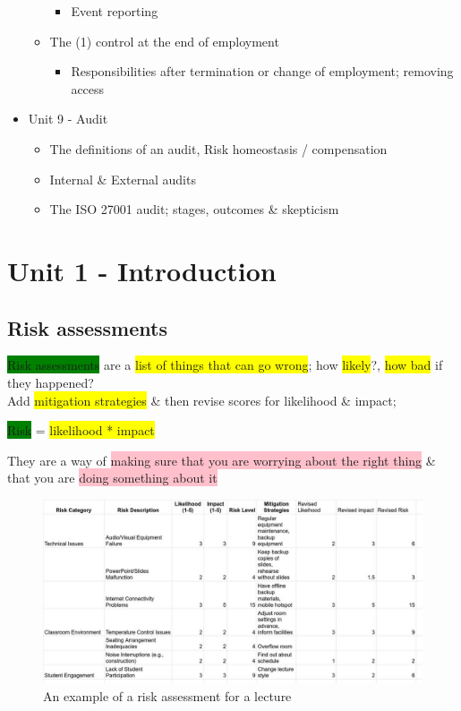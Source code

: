 \documentclass[tikz,border=10pt]{project_plan}
\begin{document}
\begin{itemize}
\begin{itemize}
\begin{itemize}
                  \item Event reporting
                \end{itemize}
          \item The (1) control at the end of employment
                \begin{itemize}
                  \item Responsibilities after termination or change of employment; removing access
                \end{itemize}
        \end{itemize}
  \item Unit 9 - Audit
        \begin{itemize}
          \item The definitions of an audit, Risk homeostasis / compensation
          \item Internal \& External audits
          \item The ISO 27001 audit; stages, outcomes \& skepticism
        \end{itemize}
\end{itemize}

\newpage

\tableofcontents{}\newpage

\chapter{Unit 1 - Introduction}

\section{Risk assessments}
\colorbox{green}{Risk assessments} are a \colorbox{yellow}{list of things that can go wrong}; how \colorbox{yellow}{likely}?, \colorbox{yellow}{how bad} if they happened?\\
Add \colorbox{yellow}{mitigation strategies} \& then revise scores for likelihood \& impact;

\colorbox{green}{Risk} = \colorbox{yellow}{likelihood * impact}

They are a way of \colorbox{pink}{making sure that you are worrying about the right thing} \& that you are \colorbox{pink}{doing something about it}

\begin{figure}[H]
  \centering
  \includegraphics[width=\linewidth]{risk assessment.png}
  \caption{An example of a risk assessment for a lecture}
\end{figure}
\end{document}

